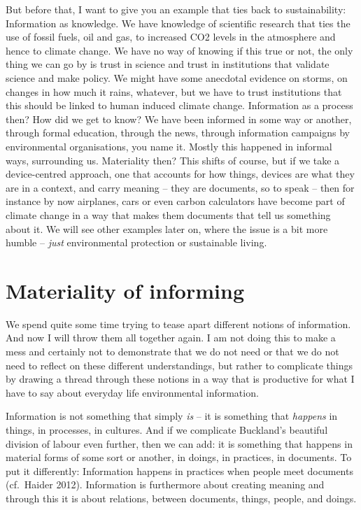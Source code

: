 ﻿\documentclass[a4paper,
fontsize=11pt,
oneside,
numbers=noperiodatend,
parskip=half-,
bibliography=totoc,
final
]{scrartcl}
\begin{document}
But before that, I want to give you an example that ties back to
sustainability: Information as knowledge. We have knowledge of
scientific research that ties the use of fossil fuels, oil and gas, to
increased CO2 levels in the atmosphere and hence to climate change. We
have no way of knowing if this true or not, the only thing we can go by
is trust in science and trust in institutions that validate science and
make policy. We might have some anecdotal evidence on storms, on changes
in how much it rains, whatever, but we have to trust institutions that
this should be linked to human induced climate change. Information as a
process then? How did we get to know? We have been informed in some way
or another, through formal education, through the news, through
information campaigns by environmental organisations, you name it.
Mostly this happened in informal ways, surrounding us. Materiality then?
This shifts of course, but if we take a device-centred approach, one
that accounts for how things, devices are what they are in a context,
and carry meaning -- they are documents, so to speak -- then for
instance by now airplanes, cars or even carbon calculators have become
part of climate change in a way that makes them documents that tell us
something about it. We will see other examples later on, where the issue
is a bit more humble -- \emph{just} environmental protection or
sustainable living.

\section*{Materiality of informing}\label{materiality-of-informing}

We spend quite some time trying to tease apart different notions of
information. And now I will throw them all together again. I am not
doing this to make a mess and certainly not to demonstrate that we do
not need or that we do not need to reflect on these different
understandings, but rather to complicate things by drawing a thread
through these notions in a way that is productive for what I have to say
about everyday life environmental information.

Information is not something that simply \emph{is} -- it is something
that \emph{happens} in things, in processes, in cultures. And if we
complicate Buckland's beautiful division of labour even further, then we
can add: it is something that happens in material forms of some sort or
another, in doings, in practices, in documents. To put it differently:
Information happens in practices when people meet documents (cf.~Haider
2012). Information is furthermore about creating meaning and through
this it is about relations, between documents, things, people, and
doings.
\end{document}
